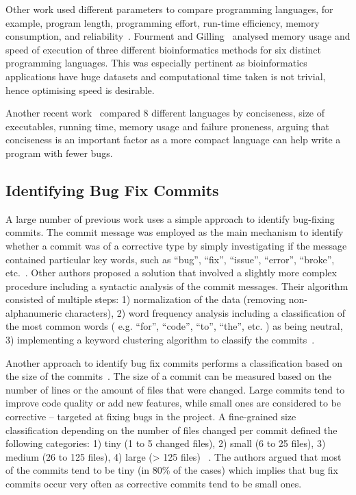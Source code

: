 \documentclass{sig-alternate}
\begin{document}
Other work used different parameters to compare programming languages, for example, program length, programming effort, run-time efficiency, memory consumption, and reliability~\cite{Prechelt2000}.  Fourment and Gilling~\cite{Fourment2008} analysed memory usage and speed of execution of three different bioinformatics methods for six distinct programming languages. This was especially pertinent as bioinformatics applications have huge datasets and computational time taken is not trivial, hence optimising speed is desirable.

Another recent work~\cite{Nanz2015} compared 8 different languages by conciseness, size of executables, running time, memory usage and failure proneness, arguing that conciseness is an important factor as a more compact language can help write a program with fewer bugs.

\subsection{Identifying Bug Fix Commits}

A large number of previous work uses a simple approach to identify bug-fixing commits. The commit message was employed as the main mechanism to identify whether a commit was of a corrective type by simply investigating if the message contained particular key words, such as ``bug'', ``fix'', ``issue'', ``error'', ``broke'', etc.~\cite{Hattori2008, Ratzinger2008, Hindle2008}.  Other authors proposed a solution that involved a slightly more complex procedure including a syntactic analysis of the commit messages. Their algorithm consisted of multiple steps: 1) normalization of the data (removing non-alphanumeric characters), 2) word frequency analysis including a classification of the most common words ( e.g. ``for'', ``code'', ``to'', ``the'', etc. ) as being neutral, 3) implementing a keyword clustering algorithm to classify the commits~\cite{Mockus2000}.

Another approach to identify bug fix commits performs a classification based on the size of the commits~\cite{Hattori2008,Mockus2000,Hindle2008}. The size of a commit can be measured based on the number of lines or the amount of files that were changed. Large commits tend to improve code quality or add new features, while small ones are considered to be corrective -- targeted at fixing bugs in the project. A fine-grained size classification depending on the number of files changed per commit defined the following categories: 1) tiny (1 to 5 changed files), 2) small (6 to 25 files), 3) medium (26 to 125 files), 4) large (> 125 files) ~\cite{Hattori2008}. The authors argued that most of the commits tend to be tiny (in 80\% of the cases) which implies that bug fix commits occur very often as corrective commits tend to be small ones.
\end{document}
